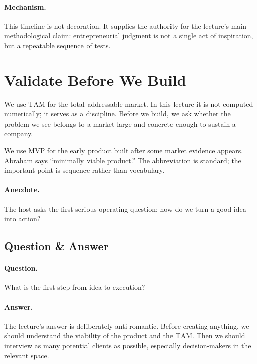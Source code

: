 \paragraph{Mechanism.} This timeline is not decoration. It supplies the authority for the lecture's main methodological claim: entrepreneurial judgment is not a single act of inspiration, but a repeatable sequence of tests.

\section{Validate Before We Build}

\begin{definition}
We use \(\mathrm{TAM}\) for the total addressable market. In this lecture it is not computed numerically; it serves as a discipline. Before we build, we ask whether the problem we see belongs to a market large and concrete enough to sustain a company.
\end{definition}

\begin{definition}
We use \(\mathrm{MVP}\) for the early product built after some market evidence appears. Abraham says ``minimally viable product.'' The abbreviation is standard; the important point is sequence rather than vocabulary.
\end{definition}

\paragraph{Anecdote.} The host asks the first serious operating question: how do we turn a good idea into action?

\subsection{Question \& Answer}

\paragraph{Question.} What is the first step from idea to execution?

\paragraph{Answer.} The lecture's answer is deliberately anti-romantic. Before creating anything, we should understand the viability of the product and the \(\mathrm{TAM}\). Then we should interview as many potential clients as possible, especially decision-makers in the relevant space.


